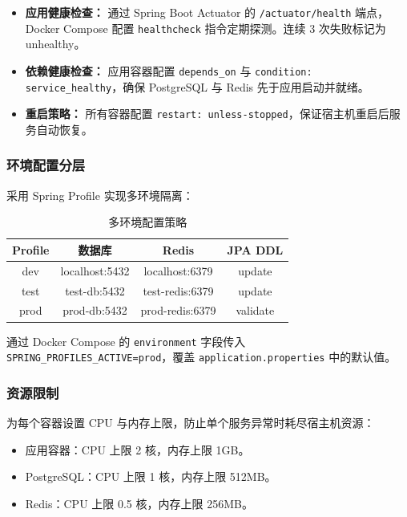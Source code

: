 \begin{itemize}
    \item \textbf{应用健康检查：} 通过 Spring Boot Actuator 的 \texttt{/actuator/health} 端点，Docker Compose 配置 \texttt{healthcheck} 指令定期探测。连续 3 次失败标记为 unhealthy。
    \item \textbf{依赖健康检查：} 应用容器配置 \texttt{depends\_on} 与 \texttt{condition: service\_healthy}，确保 PostgreSQL 与 Redis 先于应用启动并就绪。
    \item \textbf{重启策略：} 所有容器配置 \texttt{restart: unless-stopped}，保证宿主机重启后服务自动恢复。
\end{itemize}

\subsubsection{环境配置分层}

采用 Spring Profile 实现多环境隔离：

\begin{table}[htbp]
\centering
\caption{多环境配置策略}
\label{tab:env-config}
\begin{tabular}{|c|c|c|c|}
\hline
\textbf{Profile} & \textbf{数据库} & \textbf{Redis} & \textbf{JPA DDL} \\
\hline
dev & localhost:5432 & localhost:6379 & update \\
\hline
test & test-db:5432 & test-redis:6379 & update \\
\hline
prod & prod-db:5432 & prod-redis:6379 & validate \\
\hline
\end{tabular}
\end{table}

通过 Docker Compose 的 \texttt{environment} 字段传入 \texttt{SPRING\_PROFILES\_ACTIVE=prod}，覆盖 \texttt{application.properties} 中的默认值。

\subsubsection{资源限制}

为每个容器设置 CPU 与内存上限，防止单个服务异常时耗尽宿主机资源：

\begin{itemize}
    \item 应用容器：CPU 上限 2 核，内存上限 1GB。
    \item PostgreSQL：CPU 上限 1 核，内存上限 512MB。
    \item Redis：CPU 上限 0.5 核，内存上限 256MB。
\end{itemize}

